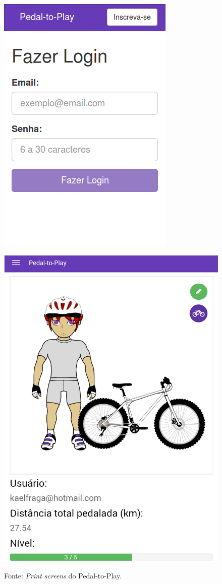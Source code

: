 \begin{figure}[h]
\begin{minipage}{.5\textwidth}
    \centering
    \includegraphics[width=.47\linewidth]{figuras/p2pAuth.png}
    \label{fig:printLogin}
\end{minipage}%
\begin{minipage}{.5\textwidth}
    \centering
    \centerline{\includegraphics[width=.5\linewidth]{figuras/p2pHome.png}}
    \label{fig:printHome}
\end{minipage}
\par%
\bigskip
\centerline{Fonte: \textit{Print screens} do Pedal-to-Play.}
\end{figure}


